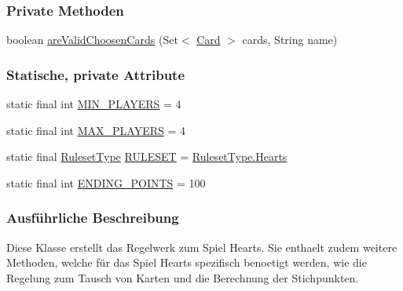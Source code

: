 \subsubsection*{Private Methoden}
\begin{DoxyCompactItemize}
\item 
boolean \hyperlink{a00067_a0a68097ee0b989d47d21198da2d32fbc}{are\-Valid\-Choosen\-Cards} (Set$<$ \hyperlink{a00054}{Card} $>$ cards, String name)
\end{DoxyCompactItemize}
\subsubsection*{Statische, private Attribute}
\begin{DoxyCompactItemize}
\item 
\hypertarget{a00067_a57fe2c01c4e61b1f0c44c70ccc75d903}{static final int \hyperlink{a00067_a57fe2c01c4e61b1f0c44c70ccc75d903}{M\-I\-N\-\_\-\-P\-L\-A\-Y\-E\-R\-S} = 4}\label{a00067_a57fe2c01c4e61b1f0c44c70ccc75d903}

\item 
\hypertarget{a00067_ae6ed433235a83c520ce79bee49bc2b01}{static final int \hyperlink{a00067_ae6ed433235a83c520ce79bee49bc2b01}{M\-A\-X\-\_\-\-P\-L\-A\-Y\-E\-R\-S} = 4}\label{a00067_ae6ed433235a83c520ce79bee49bc2b01}

\item 
\hypertarget{a00067_a3045f525de18ff0ad68134f0d512ea16}{static final \hyperlink{a00066}{Ruleset\-Type} \hyperlink{a00067_a3045f525de18ff0ad68134f0d512ea16}{R\-U\-L\-E\-S\-E\-T} = \hyperlink{a00066_a6e9f988fd4b1f5b39d289b0f44514af4}{Ruleset\-Type.\-Hearts}}\label{a00067_a3045f525de18ff0ad68134f0d512ea16}

\item 
\hypertarget{a00067_a1c46271610f140c16addf500353a090b}{static final int \hyperlink{a00067_a1c46271610f140c16addf500353a090b}{E\-N\-D\-I\-N\-G\-\_\-\-P\-O\-I\-N\-T\-S} = 100}\label{a00067_a1c46271610f140c16addf500353a090b}

\end{DoxyCompactItemize}


\subsubsection{Ausführliche Beschreibung}
Diese Klasse erstellt das Regelwerk zum Spiel Hearts. Sie enthaelt zudem weitere Methoden, welche für das Spiel Hearts spezifisch benoetigt werden, wie die Regelung zum Tausch von Karten und die Berechnung der Stichpunkten. 

